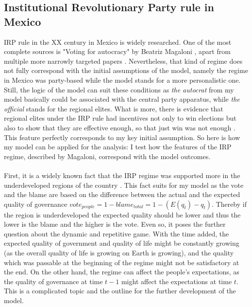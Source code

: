 \documentclass[a4paper, 12pt]{article}
\begin{document}
	\subsection*{Institutional Revolutionary Party rule in Mexico}
	IRP rule in the XX century in Mexico is widely researched. One of the most complete sources is "Voting for autocracy" by Beatriz Magaloni \parencite{votingforautocracy}, apart from multiple more narrowly targeted papers \parencite{officialmanipulates, morethanwin, stab2, dem1}. Nevertheless, that kind of regime does not fully correspond with the initial assumptions of the model, namely the regime in Mexico was party-based while the model stands for a more personalistic one. Still, the logic of the model can suit these conditions as \textit{the autocrat} from my model basically could be associated with the central party apparatus, while \textit{the  official} stands for the regional elites. What is more, there is evidence that regional elites under the IRP rule had incentives not only to win elections but also to show that they are effective enough, so that just win was not enough \parencite{morethanwin}. This feature perfectly corresponds to my key initial assumption. So here is how my model can be applied for the analysis: I test how the features of the IRP regime, described by Magaloni, correspond with the model outcomes.
	\\\\
	First, it is a widely known fact that the IRP regime was supported more in the underdeveloped regions of the country \parencite{underdevelop}. This fact suits for my model as the vote and the blame are based on the difference between the actual and the expected quality of governance $vote_{people} = 1 - blame_{total} = 1 - (E(q_t) - q_t)$. Thereby if the region is underdeveloped the expected quality should be lower and thus the lower is the blame and the higher is the vote. Even so, it poses the further question about the dynamic and repetitive game. With the time added, the expected quality of government and quality of life might be constantly growing (as the overall quality of life is growing on Earth is growing), and the quality which was passable at the beginning of the regime might not be satisfactory at the end. On the other hand, the regime can affect the people's expectations, as the quality of governance at time $t-1$ might affect the expectations at time $t$. This is a complicated topic and the outline for the further development of the model.
\end{document}
